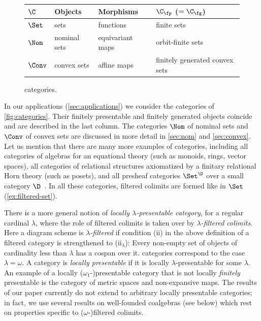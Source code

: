 \begin{example}\label{ex:categories} 
\begin{figure}[t]
\centering
\def\arraystretch{1.0}
\begin{tabular}{@{}p{1.5cm}p{2.5cm}p{3.2cm}p{5.5cm}@{}}
\toprule
$\C$ & Objects & Morphisms & $\C_\fp$ ($=\C_\fg$) \\
\midrule
$\Set$ & sets & functions & finite sets~ \\
$\Nom$ & nominal sets &  equivariant maps & orbit-finite sets \\
$\Conv$ & convex sets & affine maps & finitely generated convex sets \\
\bottomrule
\end{tabular}
\caption{\Lfplong categories.}\label{fig:categories}
\end{figure}
In our applications (\autoref{sec:applications}) we consider the \lfp categories of \autoref{fig:categories}. Their finitely presentable and finitely generated objects coincide and are described in the last column. The categories $\Nom$ of nominal sets and $\Conv$ of convex sets are discussed in more detail in \autoref{sec:nom} and \autoref{sec:convex}. Let us mention that there are many more examples of \lfp categories, including all categories of algebras for an equational theory (such as monoids, rings, vector spaces), all categories of relational structures axiomatized by a finitary relational Horn theory (such as posets), and all presheaf categories $\Set^\D$ over a small category $\D$~\cite{adamek_rosicky_1994}. In all these categories, filtered colimits are formed like in $\Set$ (\autoref{ex:filtered-set}).
\end{example}

\begin{rem}\label{rem:loc-pres}
There is a more general notion of \emph{locally $\lambda$-presentable category}, for a regular cardinal $\lambda$, where the role of filtered colimits is taken over by \emph{$\lambda$-filtered colimits}. Here a diagram scheme is \emph{$\lambda$-filtered} if condition (ii) in the above definition of a filtered category is strengthened to ($\text{ii}_\lambda$): Every non-empty set of objects of cardinality less than $\lambda$ has a cospan over it. \Lfp categories correspond to the case $\lambda=\omega$. A category is \emph{locally presentable} if it is locally $\lambda$-presentable for some $\lambda$. An example of a locally ($\omega_1$-)presentable category that is not locally \emph{finitely} presentable is the category of metric spaces and non-expansive maps. The results of our paper currently do not extend to arbitrary locally presentable categories; in fact, we use several results on well-founded coalgebras (see below) which rest on properties specific to ($\omega$-)filtered colimits.
\end{rem}




